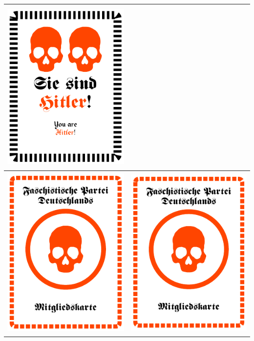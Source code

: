 \documentclass[12pt,a4paper,spanish]{article}
\begin{document}
\begin{table}
\begin{tabular}{|c|c|}
			\includegraphics[height=8.7cm, angle=90]{./Drawings/role_hitler.pdf} \\
			\midrule
			\includegraphics[height=8.7cm, angle=90]{./Drawings/party_fascist.pdf} &
			\includegraphics[height=8.7cm, angle=90]{./Drawings/party_fascist.pdf} \\

\end{tabular}
\end{table}
\end{document}
